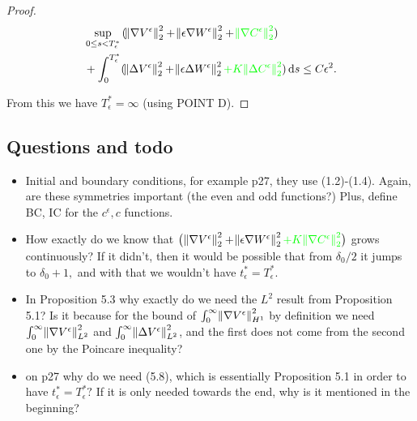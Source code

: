 \documentclass[11pt]{article}
\newcommand*\diff{\mathop{}\!\mathrm{d}}
\begin{document}
\begin{proof}
\begin{equation}
  \begin{split}
    & \sup_{0 \leq s < T^*_\epsilon}{(\norm{\nabla V^\epsilon}^2_2 + \norm{\epsilon \nabla W^\epsilon}^2_2 + \textcolor{green}{\norm{\nabla C^\epsilon}^2_2}) } \\
    & + \int_0^{T^*_\epsilon} (\norm{\Delta V^\epsilon}^2_2 + \norm{\epsilon \Delta W^\epsilon}^2_2 \textcolor{green}{+ K \norm{\Delta C^\epsilon}^2_2}) \diff s \leq C \epsilon^2.
  \end{split}
\end{equation}

From this we have $T^*_\epsilon = \infty$ (using POINT D).

\end{proof}

\subsection{Questions and todo}

\begin{itemize}

  \item Initial and boundary conditions, for example p27, they use (1.2)-(1.4). Again, are these symmetries important (the even and odd functions?) Plus, define BC, IC for the $c^\epsilon, c$ functions.
  
  \item How exactly do we know that $\big (\norm{\nabla V^\epsilon}^2_2 + \norm{\epsilon \nabla W^\epsilon}^2_2 \textcolor{green}{+ K \norm{\nabla C^\epsilon}^2_2} \big )$ grows continuously? If it didn't, then it would be possible that from $\delta_0 / 2$ it jumps to $\delta_0 +1,$ and with that we wouldn't have $t^*_\epsilon = T^*_\epsilon.$
  
  \item In Proposition 5.3 why exactly do we need the $L^2$ result from Proposition 5.1? Is it because for the bound of $\int_0^\infty \norm{\nabla V^\epsilon}^2_{H^1}$ by definition we need $\int_0^\infty \norm{\nabla V^\epsilon}^2_{L^2}$ and $\int_0^\infty \norm{\Delta V^\epsilon}^2_{L^2}$, and the first does not come from the second one by the Poincare inequality?
  
  \item on p27 why do we need (5.8), which is essentially Proposition 5.1 in order to have $t^*_\epsilon = T^*_\epsilon?$ If it is only needed towards the end, why is it mentioned in the beginning?

\end{itemize}
\end{document}
